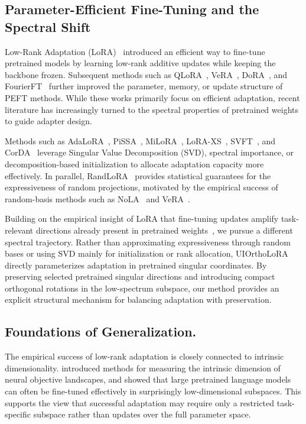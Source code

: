 \subsection{Parameter-Efficient Fine-Tuning and the Spectral Shift}
Low-Rank Adaptation (LoRA)~\citep{hu2022lora} introduced an efficient way to fine-tune pretrained models by learning low-rank additive updates while keeping the backbone frozen. Subsequent methods such as QLoRA~\citep{dettmers2023qlora}, VeRA~\citep{kopiczko2023vera}, DoRA~\citep{liu2024dora}, and FourierFT~\citep{gao2024parameter} further improved the parameter, memory, or update structure of PEFT methods. While these works primarily focus on efficient adaptation, recent literature has increasingly turned to the spectral properties of pretrained weights to guide adapter design.

Methods such as AdaLoRA~\citep{zhang2023adalora}, PiSSA~\citep{meng2024pissa}, MiLoRA~\citep{wang2025milora}, LoRA-XS~\citep{balazy2024lora}, SVFT~\citep{lingam2024svft}, and CorDA~\citep{yang2024corda} leverage Singular Value Decomposition (SVD), spectral importance, or decomposition-based initialization to allocate adaptation capacity more effectively. In parallel, RandLoRA~\citep{albert2025randlora} provides statistical guarantees for the expressiveness of random projections, motivated by the empirical success of random-basis methods such as NoLA~\citep{koohpayegani2023nola} and VeRA~\citep{kopiczko2023vera}.

Building on the empirical insight of LoRA that fine-tuning updates amplify task-relevant directions already present in pretrained weights~\citep{hu2022lora}, we pursue a different spectral trajectory. Rather than approximating expressiveness through random bases or using SVD mainly for initialization or rank allocation, UIOrthoLoRA directly parameterizes adaptation in pretrained singular coordinates. By preserving selected pretrained singular directions and introducing compact orthogonal rotations in the low-spectrum subspace, our method provides an explicit structural mechanism for balancing adaptation with preservation.

\subsection{Foundations of Generalization.}
The empirical success of low-rank adaptation is closely connected to intrinsic dimensionality. \citet{li2018measuring} introduced methods for measuring the intrinsic dimension of neural objective landscapes, and \citet{aghajanyan2020intrinsic} showed that large pretrained language models can often be fine-tuned effectively in surprisingly low-dimensional subspaces. This supports the view that successful adaptation may require only a restricted task-specific subspace rather than updates over the full parameter space.

